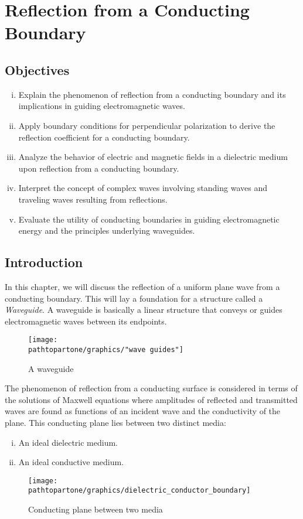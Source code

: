 \chapter{Reflection from a Conducting Boundary}\label{lec:lec34}

\begin{mdframed}[backgroundcolor=lightblue, linewidth=1pt, hidealllines=true]
\section{Objectives}
\begin{enumerate}[(i)]
\item Explain the phenomenon of reflection from a conducting boundary and its implications in guiding electromagnetic waves.
\item Apply boundary conditions for perpendicular polarization to derive the reflection coefficient for a conducting boundary.
\item Analyze the behavior of electric and magnetic fields in a dielectric medium upon reflection from a conducting boundary.
\item Interpret the concept of complex waves involving standing waves and traveling waves resulting from reflections.
\item Evaluate the utility of conducting boundaries in guiding electromagnetic energy and the principles underlying waveguides.
\end{enumerate}
\end{mdframed}

\section{Introduction}

In this chapter, we will discuss the reflection of a uniform plane wave from a conducting boundary. This will lay a foundation for a structure called a \emph{Waveguide}. A waveguide is basically a linear structure that conveys or guides electromagnetic waves between its endpoints.
\begin{figure}[h]
\centering
\texttt{[image: \\pathtopartone/graphics/"wave guides"]}
\caption{A waveguide}
\end{figure}

The phenomenon of reflection from a conducting surface is considered in terms of the solutions of Maxwell equations where amplitudes of reflected and transmitted waves are found as functions of an incident wave and the conductivity of the plane. This conducting plane lies between two distinct media: 
\begin{enumerate}[(i)]
\item An ideal dielectric medium.
\item An ideal conductive medium.
\end{enumerate}
\begin{figure}[h]
\centering
\texttt{[image: \\pathtopartone/graphics/dielectric\_conductor\_boundary]}
\caption{Conducting plane between two media}
\label{fig:plane}
\end{figure}

